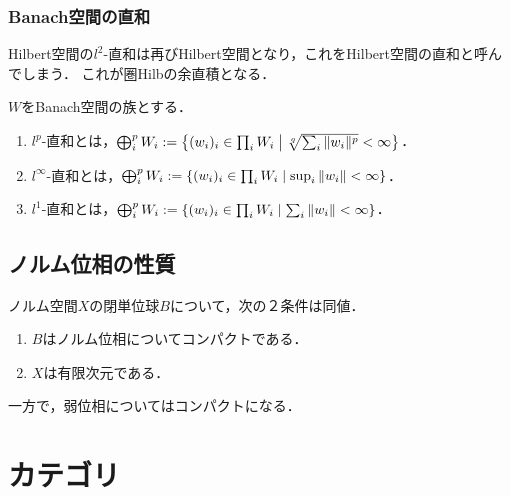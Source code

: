 \documentclass[uplatex,dvipdfmx]{jsreport}
\begin{document}
\subsubsection{Banach空間の直和}

\begin{tcolorbox}[colframe=ForestGreen, colback=ForestGreen!10!white,breakable,colbacktitle=ForestGreen!40!white,coltitle=black,fonttitle=\bfseries\sffamily,
title=]
    Hilbert空間の$l^2$-直和は再びHilbert空間となり，これをHilbert空間の直和と呼んでしまう．
    これが圏Hilbの余直積となる．
\end{tcolorbox}

\begin{definition}
    $W$をBanach空間の族とする．
    \begin{enumerate}
        \item $l^p$-直和とは，$\bigoplus_{i}^pW_i:=\left\{(w_i)_i\in\prod_{i}W_i\;\middle|\;\sqrt[q]{\sum_i\|w_i\|^p}<\infty\right\}$．
        \item $l^\infty$-直和とは，$\bigoplus_{i}^pW_i:=\left\{(w_i)_i\in\prod_{i}W_i\;\middle|\;\sup_{i}\|w_i\|<\infty\right\}$．
        \item $l^1$-直和とは，$\bigoplus_{i}^pW_i:=\left\{(w_i)_i\in\prod_{i}W_i\;\middle|\;\sum_i\|w_i\|<\infty\right\}$．
    \end{enumerate}
\end{definition}

\subsection{ノルム位相の性質}

\begin{proposition}[有限次元空間の特徴付け]\label{prop-unit-ball-in-normed-space}
    ノルム空間$X$の閉単位球$B$について，次の２条件は同値．
    \begin{enumerate}
        \item $B$はノルム位相についてコンパクトである．
        \item $X$は有限次元である．
    \end{enumerate}
\end{proposition}
\begin{remark}
    一方で，弱位相についてはコンパクトになる．
\end{remark}

\section{カテゴリ}
\end{document}

